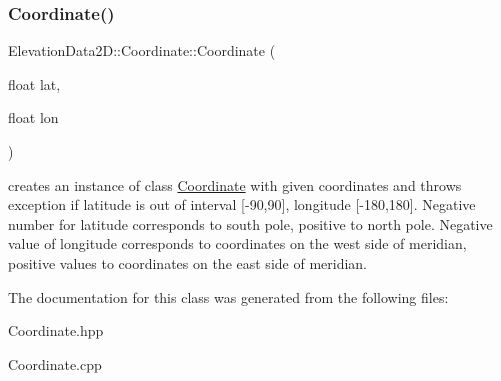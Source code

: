 \subsubsection{\texorpdfstring{Coordinate()}{Coordinate()}}
{\footnotesize\ttfamily Elevation\+Data2\+D\+::\+Coordinate\+::\+Coordinate (\begin{DoxyParamCaption}\item[{float}]{lat,  }\item[{float}]{lon }\end{DoxyParamCaption})}

creates an instance of class \mbox{\hyperlink{classElevationData2D_1_1Coordinate}{Coordinate}} with given coordinates and throws exception if latitude is out of interval \mbox{[}-\/90,90\mbox{]}, longitude \mbox{[}-\/180,180\mbox{]}. Negative number for latitude corresponds to south pole, positive to north pole. Negative value of longitude corresponds to coordinates on the west side of meridian, positive values to coordinates on the east side of meridian. 

The documentation for this class was generated from the following files\+:\begin{DoxyCompactItemize}
\item 
Coordinate.\+hpp\item 
Coordinate.\+cpp\end{DoxyCompactItemize}
